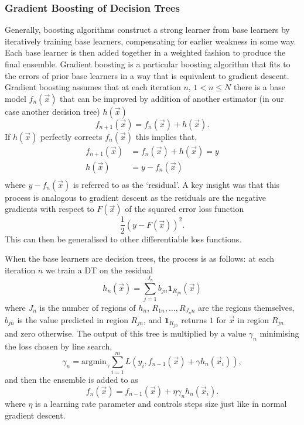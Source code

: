 \subsubsection{Gradient Boosting of Decision Trees}
Generally, boosting algorithms \cite{Boosting} construct a strong learner from base learners by iteratively training base learners, compensating for earlier weakness in some way. Each base learner is then added together in a weighted fashion to produce the final ensemble.
Gradient boosting \cite{GradientBoosting} is a particular boosting algorithm that fits to the errors of prior base learners in a way that is equivalent to gradient descent. Gradient boosting assumes that at each iteration $n$, $1<n\leq{N}$ there is a base model $f_{n}(\vec{x})$ that can be improved by addition of another estimator (in our case another decision tree) $h(\vec{x})$
\begin{equation}
    f_{n+1}(\vec{x}) = f_{n}(\vec{x}) + h(\vec{x}).
\end{equation}
If $h(\vec{x})$ perfectly corrects $f_{n}(\vec{x})$ this implies that,
\begin{equation}
    \begin{split}
        f_{n+1}(\vec{x}) &= f_{n}(\vec{x}) + h(\vec{x}) = y \\
        h(\vec{x}) &= y - f_{n}(\vec{x}) \\
    \end{split}
\end{equation}
where $y - f_{n}(\vec{x})$ is referred to as the `residual'. A key insight was that this process is analogous to gradient descent as the residuals are the negative gradients with respect to $F(\vec{x})$ of the squared error loss function
\begin{equation}
    \frac{1}{2}(y-F(\vec{x}))^{2}.
\end{equation}
This can then be generalised to other differentiable loss functions. 

When the base learners are decision trees, the process is as follows: at each iteration $n$ we train a DT on the residual 
\begin{equation}
    h_{n}(\vec{x}) = \sum_{j=1}^{J_{n}}b_{jn}\mathbf{1}_{R_{jn}}(\vec{x})
\end{equation}
where $J_n$ is the number of regions of $h_{n}$, $R_{1n},\dots,R_{J_{n}n}$ are the regions themselves, $b_{jn}$ is the value predicted in region $R_{jn}$, and $\mathbf{1}_{R_{jn}}$ returns $1$ for $\vec{x}$ in region $R_{jn}$ and zero otherwise. 
The output of this tree is multiplied by a value $\gamma_{n}$ minimising the loss chosen by line search,
\begin{equation}
    \gamma_{n} = \mathrm{argmin}_{\gamma}\sum_{i=1}^{m}L(y_{i},f_{n-1}(\vec{x})+\gamma{}h_{n}(\vec{x}_{i})),
\end{equation}
and then the ensemble is added to as
\begin{equation}
    f_{n}(\vec{x}) = f_{n-1}(\vec{x}) +\eta\gamma_{n}h_{n}(\vec{x}_{i}).
\end{equation}
where $\eta$ is a learning rate parameter and controls steps size just like in normal gradient descent. 




